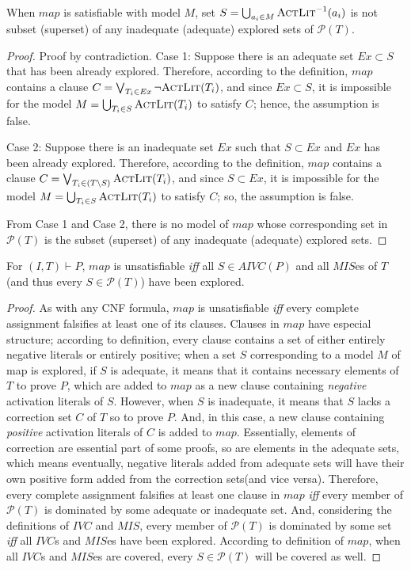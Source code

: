 \begin{lemma}
\label{lem:map:sound}
When $map$ is satisfiable with model $M$, set $S = \bigcup_{a_i \in M} \textsc{ActLit} ^{-1} (a_i)$ is not subset (superset) of any
inadequate (adequate) explored sets of $\mathcal{P}(T)$.
\end{lemma}
\begin{proof}
Proof by contradiction. Case 1: Suppose there is an adequate set $Ex \subset S$ that has been already explored. Therefore, according to the definition, $map$ contains a clause $C = \bigvee_{T_{i}\in Ex} \neg {\textsc{ActLit}(T_i)}$, and since $Ex \subset S$, it is impossible for the model $M = \bigcup_{T_i \in S} \textsc{ActLit} (T_i)$ to satisfy $C$; hence, the assumption is false.

Case 2: Suppose there is an inadequate set $Ex$ such that $S \subset Ex$ and $Ex$ has been already explored. Therefore, according to the definition, $map$ contains a clause $C = \bigvee_{T_{i}\in (T \setminus S)} \textsc{ActLit} (T_i)$, and since $S \subset Ex$, it is impossible for the model $M = \bigcup_{T_i \in S} \textsc{ActLit} (T_i)$ to satisfy $C$; so, the assumption is false.

From Case 1 and Case 2, there is no model of $map$ whose corresponding set in $\mathcal{P}(T)$ is the subset (superset) of any inadequate (adequate) explored sets.
\end{proof}


\begin{lemma}
\label{lem:map:comp}
For $(I, T) \vdash P$, $map$ is unsatisfiable \emph{iff} all $S \in AIVC(P)$ and all $MIS$es of $T$ (and thus every $S \in \mathcal{P}(T)$) have been explored.
\end{lemma}
\begin{proof}
As with any CNF formula, $map$ is unsatisfiable \emph{iff} every complete assignment falsifies at least one of its clauses. Clauses in $map$ have especial structure;
according to definition, every clause contains a set of either entirely negative literals or entirely positive; when a set $S$ corresponding to a model $M$ of map is explored, if $S$ is adequate, it means that it contains necessary elements of $T$ to prove $P$, which
are added to $map$ as a new clause containing \emph{negative} activation literals of $S$. However, when
$S$ is inadequate, it means that $S$ lacks a correction set $C$ of $T$ so to prove $P$.
And, in this case, a new clause containing \emph{positive} activation literals of $C$ is added to $map$. Essentially, elements of correction are essential part of some proofs, so are elements in the adequate sets, which means eventually, negative literals added from adequate sets will have their own  positive form added from the correction sets(and vice versa).
Therefore, every complete assignment falsifies at least one clause in $map$ \emph{iff} every
member of $\mathcal{P}(T)$ is dominated by some adequate or inadequate set.
And, considering the definitions of $IVC$ and $MIS$,  every member of $\mathcal{P}(T)$ is dominated by some set \emph{iff} all $IVC$s and $MIS$es have been explored. According to definition of $map$, when all $IVC$s and $MIS$es are covered, every $S \in \mathcal{P}(T)$ will be covered as well.
\end{proof}

